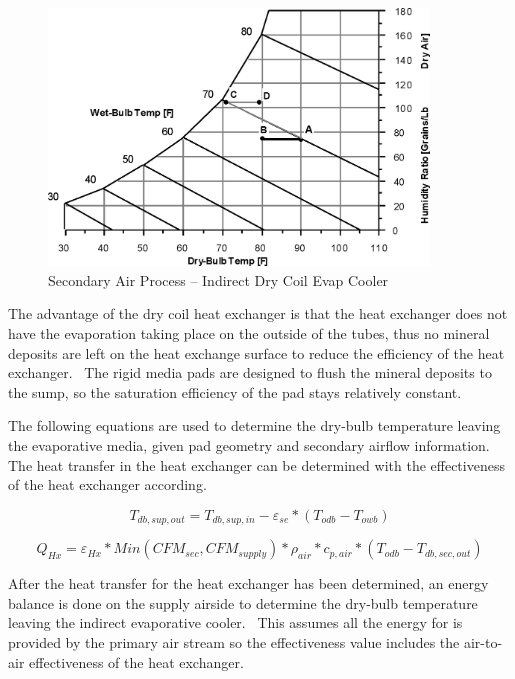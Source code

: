 \begin{figure}[hbtp] %
\centering
\includegraphics[width=0.9\textwidth, height=0.9\textheight, keepaspectratio=true]{media/image4795.png}
\caption{Secondary Air Process -- Indirect Dry Coil Evap Cooler \protect \label{fig:secondary-air-process-indirect-dry-coil-evap}}
\end{figure}

The advantage of the dry coil heat exchanger is that the heat exchanger does not have the evaporation taking place on the outside of the tubes, thus no mineral deposits are left on the heat exchange surface to reduce the efficiency of the heat exchanger.~ The rigid media pads are designed to flush the mineral deposits to the sump, so the saturation efficiency of the pad stays relatively constant.

The following equations are used to determine the dry-bulb temperature leaving the evaporative media, given pad geometry and secondary airflow information.~ The heat transfer in the heat exchanger can be determined with the effectiveness of the heat exchanger according.

\begin{equation}
T_{db,sup,out} = T_{db,sup,in} - \varepsilon_{se}*(T_{odb} - T_{owb})
\end{equation}

\begin{equation}
Q_{Hx} = \varepsilon_{Hx} * Min( CFM_{sec}, CFM_{supply}) * \rho_{air} * c_{p,air} * ( T_{odb} - T_{db,sec,out})
\end{equation}

After the heat transfer for the heat exchanger has been determined, an energy balance is done on the supply airside to determine the dry-bulb temperature leaving the indirect evaporative cooler. ~This assumes all the energy for is provided by the primary air stream so the effectiveness value includes the air-to-air effectiveness of the heat exchanger.

